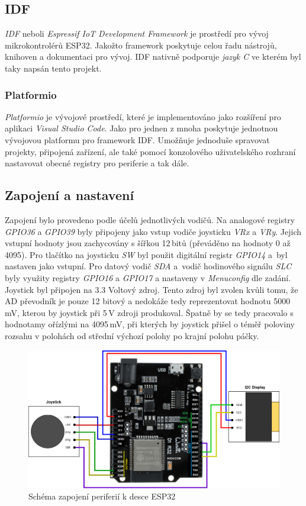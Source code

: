 \documentclass[a4paper, 11pt]{article}
\begin{document}
\subsection{IDF}
\emph{IDF} neboli \emph{Espressif IoT Development Framework} je prostředí pro vývoj mikrokontrolérů ESP32. Jakožto framework poskytuje
celou řadu nástrojů, knihoven a dokumentaci pro vývoj. IDF nativně podporuje \emph{jazyk C} ve kterém byl taky napsán tento projekt.

\subsubsection{Platformio}
\emph{Platformio} je vývojové prostředí, které je implementováno jako rozšíření pro aplikaci \emph{Visual Studio Code}. Jako pro jednen z mnoha
poskytuje jednotnou vývojovou platformu pro framework IDF. Umožňuje jednoduše spravovat projekty, připojená zařízení, ale také pomocí
konzolového uživatelského rozhraní nastavovat obecné registry pro periferie a tak dále.


\subsection{Zapojení a nastavení}
Zapojení bylo provedeno podle účelů jednotlivých vodičů. Na analogové registry \emph{GPIO36} a \emph{GPIO39} byly připojeny jako vstup vodiče
joysticku \emph{VRx} a \emph{VRy}. Jejich vstupní hodnoty jsou zachycovány s šířkou 12\,bitů (převáděno na hodnoty 0 až 4095). Pro tlačítko
na joysticku \emph{SW} byl použit digitální registr \emph{GPIO14} a~byl nastaven jako vstupní. Pro datový vodič \emph{SDA} a~vodič hodinového
signálu \emph{SLC} byly využity registry \emph{GPIO16} a \emph{GPIO17} a nastaveny v \emph{Menuconfig} dle zadání. Joystick
byl připojen na 3.3 Voltový zdroj. Tento zdroj byl zvolen kvůli tomu, že AD převodník je pouze 12 bitový a nedokáže tedy reprezentovat hodnotu
5000\,mV, kterou by joystick při 5\,V zdroji produkoval. Špatně by se tedy pracovalo s hodnotamy ořízlými na 4095\,mV, při kterých by
joystick přišel o téměř poloviny rozsahu v polohách od střední výchozí polohy po krajní polohu páčky.


\begin{figure}[h!]
    \centering
    \includegraphics[scale=0.45]{img/schema_zapojeni.png}
    \caption{Schéma zapojení periferií k desce ESP32}
    \label{fig:8}
\end{figure}
\end{document}
